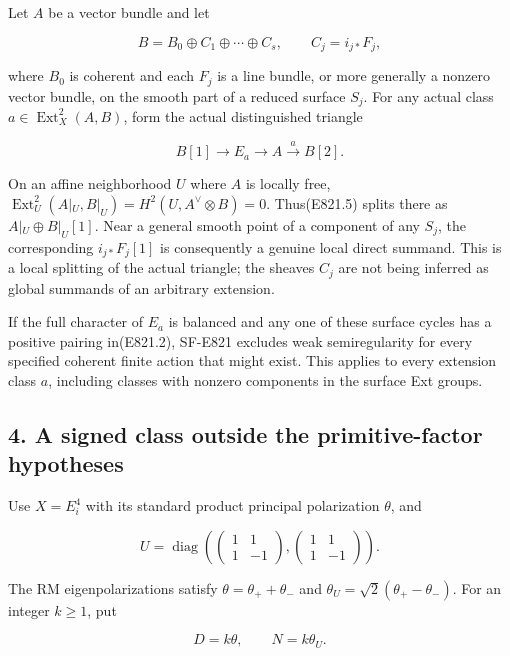 Let \(A\) be a vector bundle and let

\[
 B=B_0\oplus C_1\oplus\cdots\oplus C_s,
 \qquad C_j=i_{j*}F_j,
 \tag{E821.4}
\]

where \(B_0\) is coherent and each \(F_j\) is a line bundle, or more
generally a nonzero vector bundle, on the smooth part of a reduced
surface \(S_j\). For any actual class
\(a\in\operatorname{Ext}^2_X(A,B)\), form the actual distinguished
triangle

\[
 B[1]\longrightarrow E_a\longrightarrow A
        \xrightarrow{a}B[2].
 \tag{E821.5}
\]

On an affine neighborhood \(U\) where \(A\) is locally free,
\(\operatorname{Ext}^2_U(A|_U,B|_U)=H^2(U,A^\vee\otimes B)=0\).
Thus(E821.5) splits there as \(A|_U\oplus B|_U[1]\). Near a general
smooth point of a component of any \(S_j\), the corresponding
\(i_{j*}F_j[1]\) is consequently a genuine local direct summand. This is
a local splitting of the actual triangle; the sheaves \(C_j\) are not
being inferred as global summands of an arbitrary extension.

If the full character of \(E_a\) is balanced and any one of these
surface cycles has a positive pairing in(E821.2), SF-E821 excludes weak
semiregularity for every specified coherent finite action that might
exist. This applies to every extension class \(a\), including classes
with nonzero components in the surface Ext groups.

\subsection{4. A signed class outside the primitive-factor
hypotheses}\label{SF-E821-a-signed-class-outside-the-primitive-factor-hypotheses}

Use \(X=E_i^4\) with its standard product principal polarization
\(\theta\), and

\[
 U=\operatorname{diag}\left(
 \begin{pmatrix}1&1\\1&-1\end{pmatrix},
 \begin{pmatrix}1&1\\1&-1\end{pmatrix}\right).
\]

The RM eigenpolarizations satisfy \(\theta=\theta_++\theta_-\) and
\(\theta_U=\sqrt2(\theta_+-\theta_-)\). For an integer \(k\ge1\), put

\[
 D=k\theta,
 \qquad N=k\theta_U.
\]

